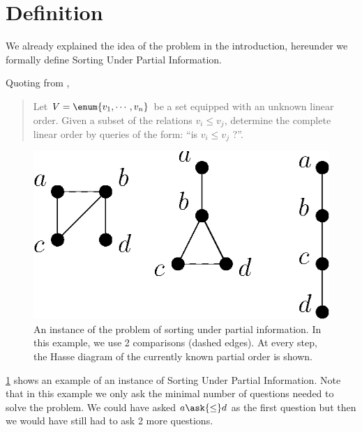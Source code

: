\section{Definition}

We already explained the idea of the problem in the introduction, hereunder we
formally define Sorting Under Partial Information.

Quoting from \cite{cardinal2013sorting},

\begin{quotation}
Let $V = \enum{v_1 , \cdots , v_n}$ be a set
equipped with an unknown linear order. Given a subset of the relations $v_i
\leq v_j$, determine the complete linear order by queries of the form: ``is
$v_i \leq v_j$ ?''.
\end{quotation}


\begin{figure} \centering \includegraphics[height=0.2\textheight]{fig/supi/ex2}
\caption{An instance of the problem of sorting under partial information. In
this example, we use 2 comparisons (dashed edges). At every step, the Hasse
diagram of the currently known partial order is shown.}
\label{fig:supi:def:ex2} \end{figure}


\ref{fig:supi:def:ex2} shows an example of an instance of Sorting Under Partial
Information. Note that in this example we only ask the minimal number of
questions needed to solve the problem. We could have asked $a \ask{\le}
d$ as the first question but then we would have still had to ask 2 more
questions.
